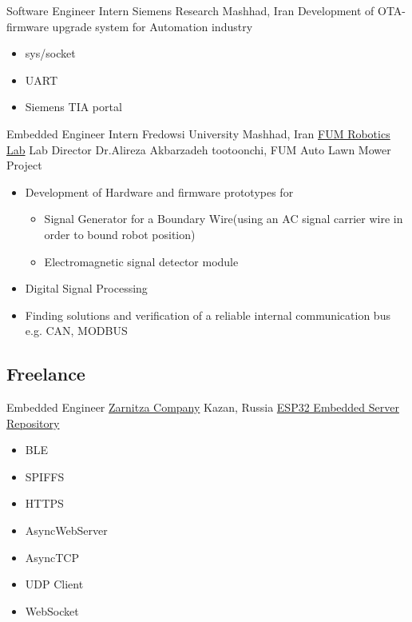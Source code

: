         {Software Engineer Intern}
        {Siemens Research}
        {Mashhad, Iran}
        {
        \newline
        Development of OTA-firmware upgrade system for Automation industry} 
        {
        \begin{itemize}
            \item sys/socket
            \item UART
            \item Siemens TIA portal 
        \end{itemize}
        }

    {Embedded Engineer Intern}
    {Fredowsi University}
    {Mashhad, Iran}
    {
    \newline
    \href{https://www.fumrobotics.ir/people/}{\color{blue}FUM Robotics Lab}
    Lab Director Dr.Alireza Akbarzadeh tootoonchi, FUM Auto Lawn Mower Project
    }
    {
    \begin{itemize}
    \item Development of Hardware and firmware prototypes for 
        \begin{itemize}
            \item  Signal Generator for a Boundary Wire(using an AC signal carrier wire in order to bound robot position)
            \item  Electromagnetic signal detector module
        \end{itemize}
    \item Digital Signal Processing
    \item Finding solutions and verification of a reliable internal communication bus e.g. CAN, MODBUS
    \end{itemize}
    }


\vspace{2mm}
\subsection{\Large{Freelance}}

        {Embedded Engineer}
        {\href{https://zarnitza.ru/}{\color{blue}Zarnitza Company}}
        {Kazan, Russia}
        {
        \newline
        \href{https://github.com/Ehsan2754/embedded-server}{\color{blue}ESP32 Embedded Server Repository}
        } 
        {
        \begin{itemize}
            \item  BLE
            \item SPIFFS
            \item HTTPS 
            \item AsyncWebServer
            \item AsyncTCP 
            \item UDP Client
            \item WebSocket
        \end{itemize}
        }
        

